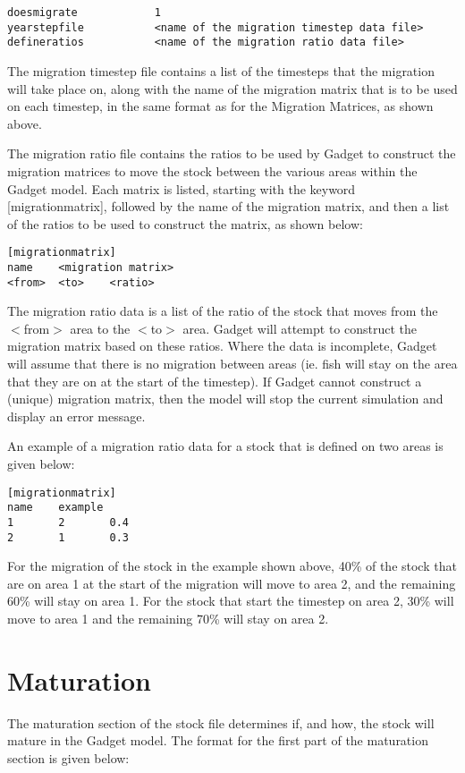 \documentclass[10pt,twoside]{book}
\begin{document}
{\small\begin{verbatim}
doesmigrate            1
yearstepfile           <name of the migration timestep data file>
defineratios           <name of the migration ratio data file>
\end{verbatim}}

The migration timestep file contains a list of the timesteps that the migration will take place on, along with the name of the migration matrix that is to be used on each timestep, in the same format as for the Migration Matrices, as shown above.

\bigskip
The migration ratio file contains the ratios to be used by Gadget to construct the migration matrices to move the stock between the various areas within the Gadget model.  Each matrix is listed, starting with the keyword [migrationmatrix], followed by the name of the migration matrix, and then a list of the ratios to be used to construct the matrix, as shown below:

{\small\begin{verbatim}
[migrationmatrix]
name    <migration matrix>
<from>  <to>    <ratio>
\end{verbatim}}

The migration ratio data is a list of the ratio of the stock that moves from the $<$from$>$ area to the $<$to$>$ area.  Gadget will attempt to construct the migration matrix based on these ratios.  Where the data is incomplete, Gadget will assume that there is no migration between areas (ie. fish will stay on the area that they are on at the start of the timestep).  If Gadget cannot construct a (unique) migration matrix, then the model will stop the current simulation and display an error message.

\bigskip
An example of a migration ratio data for a stock that is defined on two areas is given below:

{\small\begin{verbatim}
[migrationmatrix]
name    example
1       2       0.4
2       1       0.3
\end{verbatim}}

For the migration of the stock in the example shown above, 40\% of the stock that are on area 1 at the start of the migration will move to area 2, and the  remaining 60\% will stay on area 1.  For the stock that start the timestep on area 2, 30\% will move to area 1 and the remaining 70\% will stay on area 2.

\section{Maturation}\label{sec:stockmature}
The maturation section of the stock file determines if, and how, the stock will mature in the Gadget model. The format for the first part of the maturation section is given below:
\end{document}
